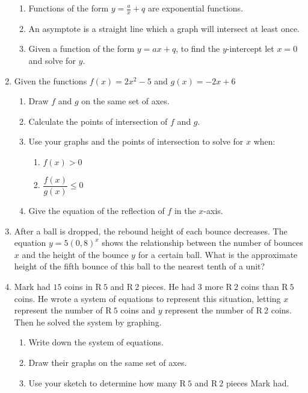 \begin{eocexercises}{}
\begin{enumerate}[itemsep=9pt, label=\textbf{\arabic*}. ]
\begin{enumerate}[noitemsep, label=\textbf{(\alph*)} ]
    \item Functions of the form $y=\frac{a}{x}+q$ are exponential functions.
    \item  An asymptote is a straight line which a graph will intersect at least once.
    \item Given a function of the form $y=ax+q$, to find the $y$-intercept let $x=0$ and solve for $y$.
    \end{enumerate}
  \item Given the functions $f(x)=2{x}^{2}-5$ and $g(x)=-2x+6$
    \begin{enumerate}[noitemsep, label=\textbf{(\alph*)} ] %
    \item Draw $f$ and $g$ on the same set of axes.
    \item Calculate the points of intersection of $f$ and $g$.
    \item Use your graphs and the points of intersection to solve for $x$ when:
      \begin{enumerate}[noitemsep, label=\textbf{\roman*}. ] %
      \item $f(x)>0$
      \item $\dfrac{f(x)}{g(x)}\leq 0$
      \end{enumerate}
    \item Give the equation of the reflection of $f$ in the $x$-axis.
    \end{enumerate}
  \item After a ball is dropped, the rebound height of each bounce
    decreases. The equation $y=5{(0,8)}^{x}$ shows the relationship
    between the number of bounces $x$ and the height of the bounce $y$
    for a certain ball.  What is the approximate height of the fifth
    bounce of this ball to the nearest tenth of a unit?
  \item Mark had $15$ coins in R$~5$ and R$~2$ pieces. He had $3$ more
    R$~2$ coins than R$~5$ coins. He wrote a system of equations to
    represent this situation, letting $x$ represent the number of R$~5$
    coins and $y$ represent the number of R$~2$ coins. Then he solved
    the system by graphing.
    \begin{enumerate}[noitemsep, label=\textbf{(\alph*)} ] %
    \item Write down the system of equations.
    \item Draw their graphs on the same set of axes.
    \item Use your sketch to determine how many R$~5$ and R$~2$ pieces Mark had.

\end{enumerate}
\end{enumerate}
\end{eocexercises}
